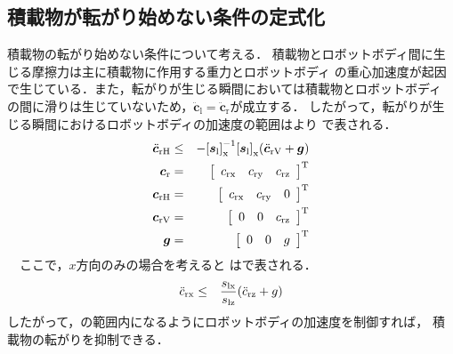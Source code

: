 \subsection{積載物が転がり始めない条件の定式化}
\label {2.3}
積載物の転がり始めない条件について考える．
積載物とロボットボディ間に生じる摩擦力は主に積載物に作用する重力とロボットボディ
の重心加速度が起因で生じている．また，転がりが生じる瞬間においては積載物とロボットボディ
の間に滑りは生じていないため，${\ddot{\bm{c}}_{\mathrm{l}}}={\ddot{\bm{c}}_{\mathrm{r}}}$が成立する．
したがって，転がりが生じる瞬間におけるロボットボディの加速度の範囲はより
で表される．\\
\begin{eqnarray}
  \equlabel{1.4}
  {\ddot{\bm{c}}_{\mathrm{rH}}} &\leq& -{[\bm{s}_{\mathrm{l}}]}_{\mathrm{x}}^{-1}{[\bm{s}_{\mathrm{l}}]}_{\mathrm{x}}({\ddot{\bm{c}}_{\mathrm{rV}}}+\bm{g})\\
  \bm{c}_{\mathrm{r}} &=&\left[
    \begin{array}{ccc}
      {c}_{\mathrm{rx}} & {c}_{\mathrm{ry}} & {c}_{\mathrm{rz}}
    \end{array}
    \right]^{\mathrm{T}}\\
  \bm{c}_{\mathrm{rH}} &=&\left[
    \begin{array}{ccc}
      {c}_{\mathrm{rx}} & {c}_{\mathrm{ry}} & 0
    \end{array}
    \right]^{\mathrm{T}}\\
  \bm{c}_{\mathrm{rV}} &=&\left[
    \begin{array}{ccc}
      0 & 0 & {c}_{\mathrm{rz}}
    \end{array}
    \right]^{\mathrm{T}}\\
  \bm{g} &=&\left[
    \begin{array}{ccc}
      0 & 0 & g
    \end{array}
    \right]^{\mathrm{T}}
\end{eqnarray}
　ここで，$x$方向のみの場合を考えると
はで表される．\\
\begin{eqnarray}
  \equlabel{1.5}
  {\ddot{c}_{\mathrm{rx}}} &\leq& \frac{{s}_{\mathrm{lx}}}{{s}_{\mathrm{lz}}}({\ddot{c}_{\mathrm{rz}}}+{g})
\end{eqnarray}
したがって，の範囲内になるようにロボットボディの加速度を制御すれば，
積載物の転がりを抑制できる．

